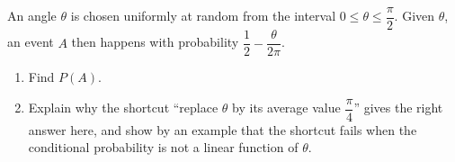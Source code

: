 An angle $\theta$ is chosen uniformly at random from the interval $0\le\theta\le\dfrac{\pi}{2}$. Given $\theta$, an event $A$ then happens with probability $\dfrac{1}{2}-\dfrac{\theta}{2\pi}$.
\begin{enumerate}
\item[(a)] Find $P(A)$.
\item[(b)] Explain why the shortcut ``replace $\theta$ by its average value $\dfrac{\pi}{4}$'' gives the right answer here, and show by an example that the shortcut fails when the conditional probability is not a linear function of $\theta$.
\end{enumerate}
